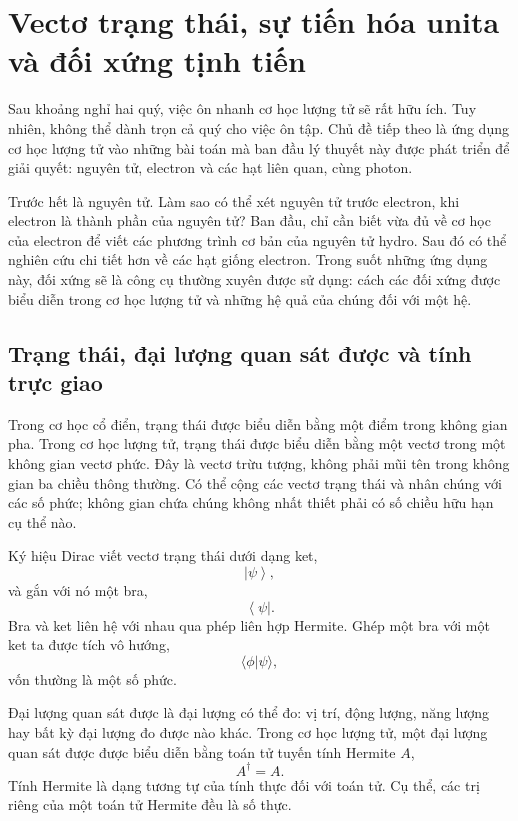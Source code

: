 \chapter{Vectơ trạng thái, sự tiến hóa unita và đối xứng tịnh tiến}
\providecommand{\ket}[1]{\left\lvert#1\right\rangle}
\providecommand{\bra}[1]{\left\langle#1\right\rvert}

Sau khoảng nghỉ hai quý, việc ôn nhanh cơ học lượng tử sẽ rất hữu ích. Tuy nhiên, không thể dành trọn cả quý cho việc ôn tập. Chủ đề tiếp theo là ứng dụng cơ học lượng tử vào những bài toán mà ban đầu lý thuyết này được phát triển để giải quyết: nguyên tử, electron và các hạt liên quan, cùng photon.

Trước hết là nguyên tử. Làm sao có thể xét nguyên tử trước electron, khi electron là thành phần của nguyên tử? Ban đầu, chỉ cần biết vừa đủ về cơ học của electron để viết các phương trình cơ bản của nguyên tử hydro. Sau đó có thể nghiên cứu chi tiết hơn về các hạt giống electron. Trong suốt những ứng dụng này, đối xứng sẽ là công cụ thường xuyên được sử dụng: cách các đối xứng được biểu diễn trong cơ học lượng tử và những hệ quả của chúng đối với một hệ.

\section{Trạng thái, đại lượng quan sát được và tính trực giao}

Trong cơ học cổ điển, trạng thái được biểu diễn bằng một điểm trong không gian pha. Trong cơ học lượng tử, trạng thái được biểu diễn bằng một vectơ trong một không gian vectơ phức. Đây là vectơ trừu tượng, không phải mũi tên trong không gian ba chiều thông thường. Có thể cộng các vectơ trạng thái và nhân chúng với các số phức; không gian chứa chúng không nhất thiết phải có số chiều hữu hạn cụ thể nào.

Ký hiệu Dirac viết vectơ trạng thái dưới dạng ket,
\begin{equation}
\ket{\psi},
\end{equation}
và gắn với nó một bra,
\begin{equation}
\bra{\psi}.
\end{equation}
Bra và ket liên hệ với nhau qua phép liên hợp Hermite. Ghép một bra với một ket ta được tích vô hướng,
\begin{equation}
\langle\phi|\psi\rangle,
\end{equation}
vốn thường là một số phức.

Đại lượng quan sát được là đại lượng có thể đo: vị trí, động lượng, năng lượng hay bất kỳ đại lượng đo được nào khác. Trong cơ học lượng tử, một đại lượng quan sát được được biểu diễn bằng toán tử tuyến tính Hermite \(A\),
\begin{equation}
A^\dagger=A.
\end{equation}
Tính Hermite là dạng tương tự của tính thực đối với toán tử. Cụ thể, các trị riêng của một toán tử Hermite đều là số thực.

